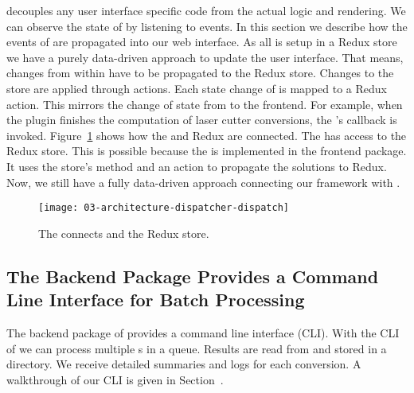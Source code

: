\documentclass[../../ClassicThesis.tex]{subfiles}
\begin{document}
{\convertify} decouples any user interface specific code
from the actual logic and rendering. We can observe the
state of {\convertify} by listening to events. In this
section we describe how the events of {\convertify} are
propagated into our web interface. As all {\userinterface}
is setup in a Redux store we have a purely data-driven
approach to update the user interface. That means, changes
from within {\convertify} have to be propagated to the Redux
store. Changes to the store are applied through actions.
Each state change of {\convertify} is mapped to a Redux
action. This mirrors the change of state from {\convertify}
to the frontend. For example, when the
 plugin finishes the computation of
laser cutter conversions, the 's
 callback is invoked.
Figure~\ref{fig:dispatcher-dispatch} shows how the
 and Redux are connected. The
 has access to the Redux store. This is
possible because the  is implemented in
the frontend package. It uses the store's
 method and an action to propagate the
solutions to Redux. Now, we still have a fully data-driven
approach connecting our framework with {\platener}.

\begin{figure}
  \centering
  \texttt{[image: 03-architecture-dispatcher-dispatch]}
  \caption{The  connects {\convertify} and the Redux store.}
  \label{fig:dispatcher-dispatch}
\end{figure}

\subsection{The Backend Package Provides a Command Line Interface for
  Batch Processing}
\label{sec:cli-tool}





The backend package of {\platener} provides a command line interface
(CLI). With the CLI of {\platener} we can process multiple
{\threedmodel}s in a queue. Results are read from and stored in
a directory. We receive detailed summaries and logs for each
conversion. A walkthrough of our CLI is given in
Section~.
\end{document}
